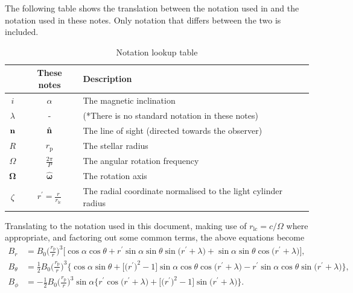 \documentclass{book}
\newcommand{\rL}{r_\text{lc}} %
\newcommand{\rp}{r_\text{p}} %
\begin{document}
The following table shows the translation between the notation used in \citet{Barnard1986} and the notation used in these notes.
Only notation that differs between the two is included.
\begin{table}[!h]
    \centering
    \caption{Notation lookup table}
    \label{tbl:barnard_notation}
    \begin{tabular}{ccl}
        \citet{Barnard1986} & These notes & Description \\
        \hline
        $i$ & $\alpha$ & The magnetic inclination \\
        $\lambda$ & - & (*There is no standard notation in these notes) \\
        ${\bf n}$ & $\hat{\bf n}$ & The line of sight (directed towards the observer) \\
        $R$ & $\rp$ & The stellar radius \\
        $\Omega$ & $\frac{2\pi}{P}$ & The angular rotation frequency \\
        ${\bm \Omega}$ & $\hat{\bm \omega}$ & The rotation axis \\
        $\zeta$ & $r^\prime = \frac{r}{\rL}$ & The radial coordinate normalised to the light cylinder radius \\
        \hline
    \end{tabular}
\end{table}

Translating to the notation used in this document, making use of $\rL = c/\Omega$ where appropriate, and factoring out some common terms, the above equations become
\begin{equation}
    \begin{aligned}
        B_r &= B_0\bigg(\frac{\rp}{r}\bigg)^3 \bigg[ \cos \alpha \cos \theta +
               r^\prime \sin \alpha \sin \theta \sin\big(r^\prime + \lambda\big) +
               \sin \alpha \sin \theta \cos\big(r^\prime + \lambda\big)\bigg], \\
        B_\theta &= \frac{1}{2}B_0 \bigg(\frac{\rp}{r}\bigg)^3 \bigg\{\cos \alpha \sin \theta +
                    \Big[\big(r^\prime\big)^2 - 1\Big] \sin \alpha \cos \theta \cos\big(r^\prime + \lambda\big) -
                    r^\prime \sin \alpha \cos \theta \sin\big(r^\prime + \lambda\big)\bigg\}, \\
        B_\phi &= -\frac{1}{2} B_0 \bigg(\frac{\rp}{r}\bigg)^3 \sin \alpha \bigg\{r^\prime \cos\big(r^\prime + \lambda\big) +
                  \Big[\big(r^\prime\big)^2 - 1\Big] \sin\big(r^\prime + \lambda\big)\bigg\}.
    \end{aligned}
\end{equation}
\end{document}
